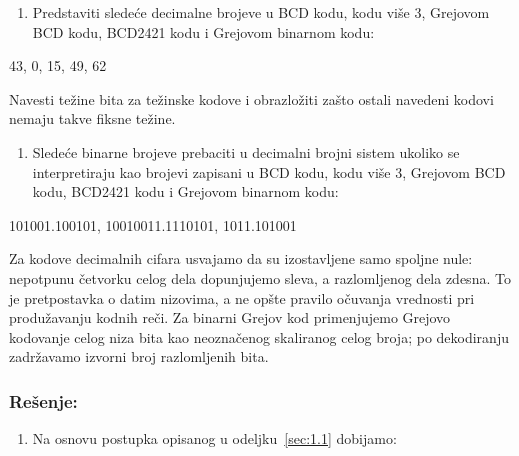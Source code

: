 \documentclass[a4paper,11pt]{article}
\numberwithin{equation}{section}
\newcommand{\napomena}[1]{\begin{tcolorbox}[colback=gray!10,colframe=black,boxrule=0.5pt,breakable]#1\end{tcolorbox}}
\begin{document}
\begin{enumerate}[label=\alph*),start=1,leftmargin=*]
\item Predstaviti sledeće decimalne brojeve u BCD kodu, kodu više 3, Grejovom BCD kodu, BCD2421 kodu i Grejovom binarnom kodu:

\end{enumerate}


43, 0, 15, 49, 62



Navesti težine bita za težinske kodove i obrazložiti zašto ostali navedeni kodovi nemaju takve fiksne težine.

\begin{enumerate}[label=\alph*),start=2,leftmargin=*]
\item Sledeće binarne brojeve prebaciti u decimalni brojni sistem ukoliko se interpretiraju kao brojevi zapisani u BCD kodu, kodu više 3, Grejovom BCD kodu, BCD2421 kodu i Grejovom binarnom kodu:

\end{enumerate}


101001.100101, 10010011.1110101, 1011.101001

\napomena{Za kodove decimalnih cifara usvajamo da su izostavljene samo spoljne nule: nepotpunu četvorku celog dela dopunjujemo sleva, a razlomljenog dela zdesna. To je pretpostavka o datim nizovima, a ne opšte pravilo očuvanja vrednosti pri produžavanju kodnih reči. Za binarni Grejov kod primenjujemo Grejovo kodovanje celog niza bita kao neoznačenog skaliranog celog broja; po dekodiranju zadržavamo izvorni broj razlomljenih bita.}



\subsubsection*{Rešenje:}


\begin{enumerate}[label=\alph*),start=1,leftmargin=*]
\item Na osnovu postupka opisanog u odeljku~\ref{sec:1.1} dobijamo:

\end{enumerate}
\end{document}
